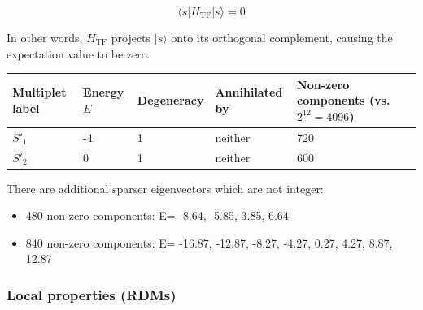 \documentclass[11pt,a4paper]{article}
\begin{document}
\begin{equation}
\langle s|  H_{\text{TF}} |s \rangle = 0
\end{equation}

In other words,  $H_{\text{TF}}$ projects $|s\rangle$ onto its orthogonal complement, causing the expectation value to be zero.\\

\begin{center}
\begin{tabular}{L{3.5cm} C{2.2cm} C{2.2cm} C{2.2cm} C{3.0cm} C{3.2cm}}
\toprule
\textbf{Multiplet label} & \textbf{Energy $E$} & \textbf{Degeneracy} & \textbf{Annihilated by} & \textbf{Non-zero components (vs.\ $2^{12} = 4096$)} \\
\midrule
$S'_1$ & -4 & 1 & neither & 720 \\
$S'_2$ & 0 & 1 & neither & 600 \\
\bottomrule
\end{tabular}
\end{center}

There are additional sparser eigenvectors which are not integer:

\begin{itemize}
\item 480 non-zero components: E= -8.64, -5.85, 3.85, 6.64 
\item 840 non-zero components: E= -16.87, -12.87, -8.27, -4.27, 0.27, 4.27, 8.87, 12.87 
\end{itemize}

\subsubsection*{Local properties (RDMs)}
\end{document}
